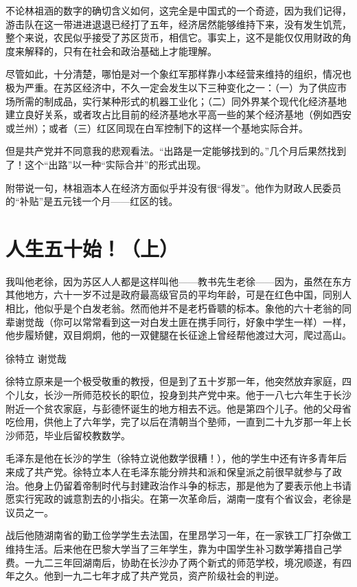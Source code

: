 \documentclass[10pt]{book}
\begin{document}
不论林祖涵的数字的确切含义如何，这完全是中国式的一个奇迹，因为我们记得，游击队在这一带进进退退已经打了五年，经济居然能够维持下来，没有发生饥荒，整个来说，农民似乎接受了苏区货币，相信它。事实上，这不是能仅仅用财政的角度来解释的，只有在社会和政治基础上才能理解。

尽管如此，十分清楚，哪怕是对一个象红军那样靠小本经营来维持的组织，情况也极为严重。在苏区经济中，不久一定会发生以下三种变化之一：（一）为了供应市场所需的制成品，实行某种形式的机器工业化；（二）同外界某个现代化经济基地建立良好关系，或者攻占比目前的经济基地水平高一些的某个经济基地（例如西安或兰州）；或者（三）红区同现在白军控制下的这样一个基地实际合并。

但是共产党并不同意我的悲观看法。“出路是一定能够找到的。”几个月后果然找到了！这个“出路”以一种“实际合并”的形式出现。

附带说一句，林祖涵本人在经济方面似乎并没有很“得发”。他作为财政人民委员的“补贴”是五元钱一个月——红区的钱。



\section{人生五十始！（上）}

我叫他老徐，因为苏区人人都是这样叫他——教书先生老徐——因为，虽然在东方其他地方，六十一岁不过是政府最高级官员的平均年龄，可是在红色中国，同别人相比，他似乎是个白发老翁。然而他并不是老朽昏聩的标本。象他的六十老翁的同辈谢觉哉（你可以常常看到这一对白发土匪在携手同行，好象中学生一样）一样，他步履矫健，双目炯炯，他的一双健腿在长征途上曾经帮他渡过大河，爬过高山。

徐特立 谢觉哉

徐特立原来是一个极受敬重的教授，但是到了五十岁那一年，他突然放弃家庭，四个儿女，长沙一所师范校长的职位，投身到共产党中来。他于一八七六年生于长沙附近一个贫农家庭，与彭德怀诞生的地方相去不远。他是第四个儿子。他的父母省吃俭用，供他上了六年学，完了以后在清朝当个塾师，一直到二十九岁那一年上长沙师范，毕业后留校教数学。

毛泽东是他在长沙的学生（徐特立说他数学很糟！），他的学生中还有许多青年后来成了共产党。徐特立本人在毛泽东能分辨共和派和保皇派之前很早就参与了政治。他身上仍留着帝制时代与封建政治作斗争的标志，那是他为了要表示他上书请愿实行宪政的诚意割去的小指尖。在第一次革命后，湖南一度有个省议会，老徐是议员之一。

战后他随湖南省的勤工俭学学生去法国，在里昂学习一年，在一家铁工厂打杂做工维持生活。后来他在巴黎大学当了三年学生，靠为中国学生补习数学筹措自己学费。一九二三年回湖南后，协助在长沙办了两个新式的师范学校，境况顺遂，有四年之久。他到一九二七年才成了共产党员，资产阶级社会的判逆。
\end{document}

